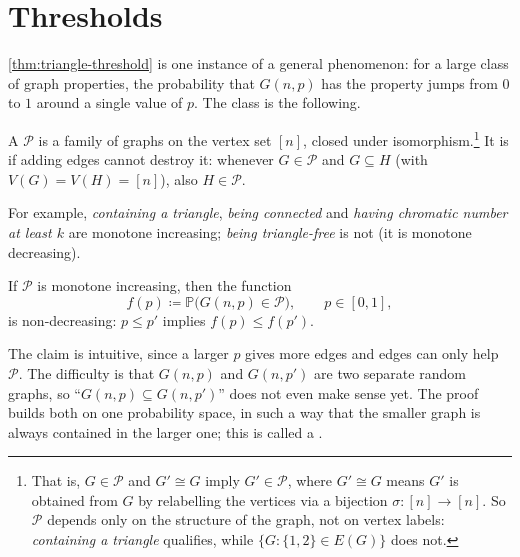 \section{Thresholds}\label{sec:thresholds}

\autoref{thm:triangle-threshold} is one instance of a general phenomenon: for a large class of graph properties, the probability that \(G(n,p)\) has the property jumps from \(0\) to \(1\) around a single value of \(p\). The class is the following.

\begin{definition}\label{def:monotone-property}
    A  \(\mathcal{P}\) is a family of graphs on the vertex set \([n]\), closed under isomorphism.\footnote{That is, \(G \in \mathcal{P}\) and \(G' \cong G\) imply \(G' \in \mathcal{P}\), where \(G' \cong G\) means \(G'\) is obtained from \(G\) by relabelling the vertices via a bijection \(\sigma \colon [n] \to [n]\). So \(\mathcal{P}\) depends only on the structure of the graph, not on vertex labels: \emph{containing a triangle} qualifies, while \(\{G : \{1,2\} \in E(G)\}\) does not.} It is  if adding edges cannot destroy it: whenever \(G \in \mathcal{P}\) and \(G \subseteq H\) (with \(V(G) = V(H) = [n]\)), also \(H \in \mathcal{P}\).
\end{definition}

For example, \emph{containing a triangle}, \emph{being connected} and \emph{having chromatic number at least \(k\)} are monotone increasing; \emph{being triangle-free} is not (it is monotone decreasing).

\begin{lemma}\label{lem:monotone-coupling}
    If \(\mathcal{P}\) is monotone increasing, then the function
    \[
        f(p) \coloneqq \mathbb{P}\bigl( G(n,p) \in \mathcal{P} \bigr), \qquad p \in [0,1],
    \]
    is non-decreasing: \(p \le p'\) implies \(f(p) \le f(p')\).
\end{lemma}

The claim is intuitive, since a larger \(p\) gives more edges and edges can only help \(\mathcal{P}\). The difficulty is that \(G(n,p)\) and \(G(n,p')\) are two separate random graphs, so ``\(G(n,p) \subseteq G(n,p')\)'' does not even make sense yet. The proof builds both on one probability space, in such a way that the smaller graph is always contained in the larger one; this is called a .

